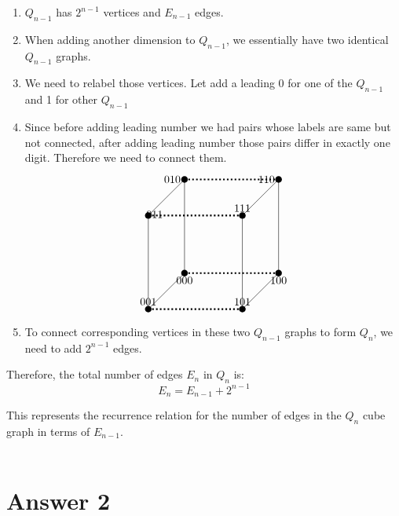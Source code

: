 \documentclass[12pt]{article}
\begin{document}
\begin{enumerate}
    \item \( Q_{n-1} \) has \( 2^{n-1} \) vertices and \( E_{n-1} \) edges.
    \item When adding another dimension to \( Q_{n-1} \), we essentially have two identical \( Q_{n-1} \) graphs.
    \item We need to relabel those vertices. Let add a leading 0 for one of the \( Q_{n-1} \) and 1 for other \( Q_{n-1} \)
    \item Since before adding leading number we had pairs whose labels are same but not connected, after adding leading number those pairs differ in exactly one digit. Therefore we need to connect them. \\
    \[
\begin{tikzpicture}[scale=1.5]
    \coordinate[label=below:000] (000) at (0,0,0);
    \coordinate[label=above:001] (002) at (0,0,2);
    \coordinate[label=left:010] (020) at (0,2,0);
    \coordinate[label={[shift={(0.2,-0.2)}]above:011}] (022) at (0,2,2);
    \coordinate[label=below:100] (200) at (2,0,0);
    \coordinate[label=above:101] (202) at (2,0,2);
    \coordinate[label=left:110] (220) at (2,2,0);
    \coordinate[label=above:111] (222) at (2,2,2);

   \foreach \point in {(000),(002),(020),(022),(200),(202),(220),(222)} {
        \fill \point circle[radius=2pt];
    }
    \draw (000) -- (002) -- (022) -- (020) -- cycle;
    \draw (200) -- (202) -- (222) -- (220) -- cycle;
    \draw[dotted, line width=1.5pt]  (000) -- (200);
    \draw[dotted, line width=1.5pt] (002) -- (202);
    \draw[dotted, line width=1.5pt] (020) -- (220);
    \draw[dotted, line width=1.5pt] (022) -- (222);
\end{tikzpicture}
\]
    \item To connect corresponding vertices in these two \( Q_{n-1} \) graphs to form \( Q_n \), we need to add \( 2^{n-1} \) edges.
\end{enumerate}

Therefore, the total number of edges \( E_n \) in \( Q_n \) is:
\[ E_n = E_{n-1} + 2^{n-1} \]

This represents the recurrence relation for the number of edges in the \( Q_n \) cube graph in terms of \( E_{n-1} \). \\ \\


\section*{Answer 2}
\end{document}
